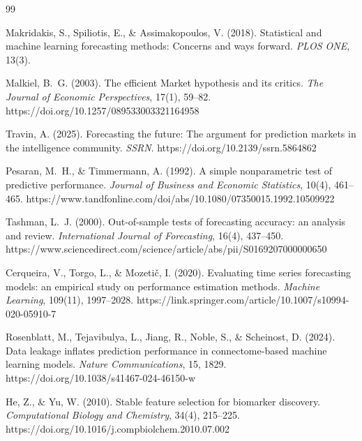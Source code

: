 \newpage
\begin{thebibliography}{99}

Makridakis, S., Spiliotis, E., \& Assimakopoulos, V. (2018).
Statistical and machine learning forecasting methods: Concerns and ways forward.
\textit{PLOS ONE}, 13(3).

Malkiel, B.~G. (2003).
The efficient Market hypothesis and its critics.
\textit{The Journal of Economic Perspectives}, 17(1), 59--82.
https://doi.org/10.1257/089533003321164958

Travin, A. (2025).
Forecasting the future: The argument for prediction markets in the intelligence community.
\textit{SSRN}.
https://doi.org/10.2139/ssrn.5864862

Pesaran, M.~H., \& Timmermann, A. (1992).
A simple nonparametric test of predictive performance.
\textit{Journal of Business and Economic Statistics}, 10(4), 461--465.
https://www.tandfonline.com/doi/abs/10.1080/07350015.1992.10509922

Tashman, L.~J. (2000).
Out-of-sample tests of forecasting accuracy: an analysis and review.
\textit{International Journal of Forecasting}, 16(4), 437--450.
https://www.sciencedirect.com/science/article/abs/pii/S0169207000000650

Cerqueira, V., Torgo, L., \& Mozeti\v{c}, I. (2020).
Evaluating time series forecasting models: an empirical study on performance estimation methods.
\textit{Machine Learning}, 109(11), 1997--2028.
https://link.springer.com/article/10.1007/s10994-020-05910-7

Rosenblatt, M., Tejavibulya, L., Jiang, R., Noble, S., \& Scheinost, D. (2024).
Data leakage inflates prediction performance in connectome-based machine learning models.
\textit{Nature Communications}, 15, 1829.
https://doi.org/10.1038/s41467-024-46150-w

He, Z., \& Yu, W. (2010).
Stable feature selection for biomarker discovery.
\textit{Computational Biology and Chemistry}, 34(4), 215--225.
https://doi.org/10.1016/j.compbiolchem.2010.07.002

\end{thebibliography}
